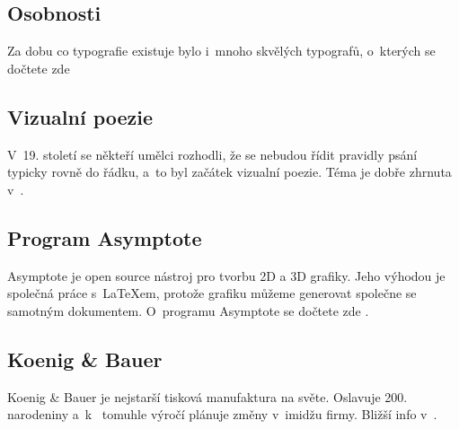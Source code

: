 \documentclass[a4paper, 11pt]{article}
\begin{document}
\subsection{Osobnosti}
 Za dobu co typografie existuje bylo i~mnoho skvělých typografů, o~kterých se dočtete zde \cite{Heller}

\subsection{Vizualní poezie}
V~19. století se někteří umělci rozhodli, že se nebudou řídit pravidly psání typicky rovně do řádku, a~to byl začátek vizualní poezie. Téma je dobře zhrnuta v~\cite{Hillner}.

\subsection{Program Asymptote}
Asymptote je open source nástroj pro tvorbu 2D a 3D grafiky. Jeho výhodou je společná práce s~\LaTeX em, protože grafiku můžeme generovat společne se samotným dokumentem. O~programu Asymptote se dočtete zde \cite{Kutal}.

\subsection{Koenig \& Bauer}
Koenig \& Bauer je nejstarší tisková manufaktura na světe. Oslavuje 200. narodeniny a~k~
tomuhle výročí plánuje změny v~imidžu firmy. Bližší info v~\cite{Neale}.





\newpage


\end{document}
